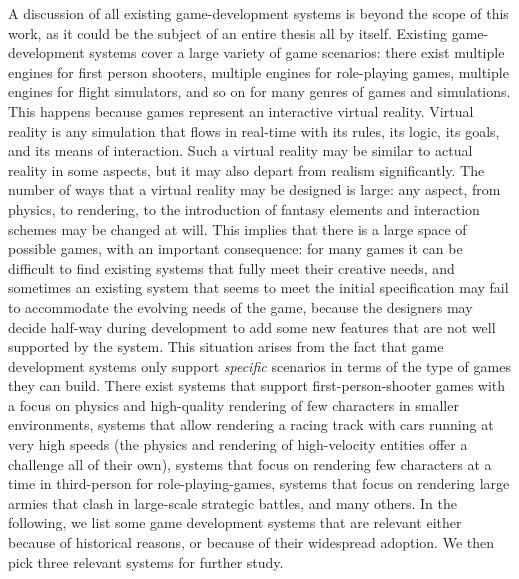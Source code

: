 A discussion of all existing game-development systems is beyond the scope of this work, as it could be the subject of an entire thesis all by itself. Existing game-development systems cover a large variety of game scenarios: there exist multiple engines for first person shooters, multiple engines for role-playing games, multiple engines for flight simulators, and so on for many genres of games and simulations. This happens because games represent an interactive virtual reality. Virtual reality is any simulation that flows in real-time with its rules, its logic, its goals, and its means of interaction. Such a virtual reality may be similar to actual reality in some aspects, but it may also depart from realism significantly. The number of ways that a virtual reality may be designed is large: any aspect, from physics, to rendering, to the introduction of fantasy elements and interaction schemes may be changed at will. This implies that there is a large space of possible games, with an important consequence: for many games it can be difficult to find existing systems that fully meet their creative needs, and sometimes an existing system that seems to meet the initial specification may fail to accommodate the evolving needs of the game, because the designers may decide half-way during development to add some new features that are not well supported by the system. This situation arises from the fact that game development systems only support \textit{specific} scenarios in terms of the type of games they can build. There exist systems that support first-person-shooter games with a focus on physics and high-quality rendering of few characters in smaller environments, systems that allow rendering a racing track with cars running at very high speeds (the physics and rendering of high-velocity entities offer a challenge all of their own), systems that focus on rendering few characters at a time in third-person for role-playing-games, systems that focus on rendering large armies that clash in large-scale strategic battles, and many others. In the following, we list some game development systems that are relevant either because of historical reasons, or because of their widespread adoption. We then pick three relevant systems for further study.



